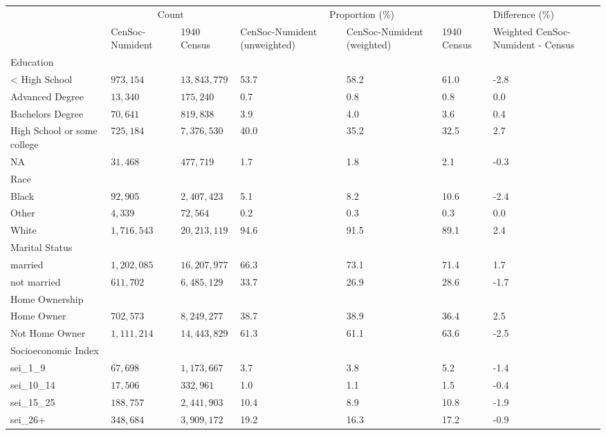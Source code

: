 \captionsetup[table]{labelformat=empty,skip=1pt}
\begin{longtable}{lllllll}
\toprule
 & \multicolumn{2}{c}{Count} & \multicolumn{3}{c}{Proportion (\%)} & Difference (\%) \\ 
 \cmidrule(lr){2-3} \cmidrule(lr){4-6} \cmidrule(lr){7-7}
 & CenSoc-Numident & 1940 Census & CenSoc-Numident (unweighted) & CenSoc-Numident (weighted) & 1940 Census & Weighted CenSoc-Numident - Census \\ 
\midrule
\multicolumn{1}{l}{Education} \\ 
\midrule
< High School & $973,154$ & $13,843,779$ & 53.7 & 58.2 & 61.0 & -2.8 \\ 
Advanced Degree & $13,340$ & $175,240$ & 0.7 & 0.8 & 0.8 & 0.0 \\ 
Bachelors Degree & $70,641$ & $819,838$ & 3.9 & 4.0 & 3.6 & 0.4 \\ 
High School or some college & $725,184$ & $7,376,530$ & 40.0 & 35.2 & 32.5 & 2.7 \\ 
NA & $31,468$ & $477,719$ & 1.7 & 1.8 & 2.1 & -0.3 \\ 
\midrule
\multicolumn{1}{l}{Race} \\ 
\midrule
Black & $92,905$ & $2,407,423$ & 5.1 & 8.2 & 10.6 & -2.4 \\ 
Other & $4,339$ & $72,564$ & 0.2 & 0.3 & 0.3 & 0.0 \\ 
White & $1,716,543$ & $20,213,119$ & 94.6 & 91.5 & 89.1 & 2.4 \\ 
\midrule
\multicolumn{1}{l}{Marital Status} \\ 
\midrule
married & $1,202,085$ & $16,207,977$ & 66.3 & 73.1 & 71.4 & 1.7 \\ 
not married & $611,702$ & $6,485,129$ & 33.7 & 26.9 & 28.6 & -1.7 \\ 
\midrule
\multicolumn{1}{l}{Home Ownership} \\ 
\midrule
Home Owner & $702,573$ & $8,249,277$ & 38.7 & 38.9 & 36.4 & 2.5 \\ 
Not Home Owner & $1,111,214$ & $14,443,829$ & 61.3 & 61.1 & 63.6 & -2.5 \\ 
\midrule
\multicolumn{1}{l}{Socioeconomic Index} \\ 
\midrule
sei\_1\_9 & $67,698$ & $1,173,667$ & 3.7 & 3.8 & 5.2 & -1.4 \\ 
sei\_10\_14 & $17,506$ & $332,961$ & 1.0 & 1.1 & 1.5 & -0.4 \\ 
sei\_15\_25 & $188,757$ & $2,441,903$ & 10.4 & 8.9 & 10.8 & -1.9 \\ 
sei\_26+ & $348,684$ & $3,909,172$ & 19.2 & 16.3 & 17.2 & -0.9 \\ 

\end{longtable}
